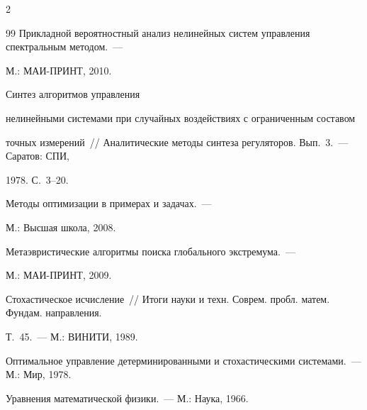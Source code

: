 \begin{multicols}{2}
{{\begin{thebibliography}{99}
Прикладной вероятностный анализ нелинейных сис\-тем управления спектральным методом.~--- 


М.: МАИ-ПРИНТ, 2010.







 Синтез алгоритмов управления 


нелинейными сис\-те\-мами при случайных воздействиях с ограниченным составом


точных измерений~// Аналитические методы синтеза регуляторов. Вып.~3.~--- Саратов: СПИ, 


1978. С.~3--20.







 Методы оптимизации в примерах и задачах.~--- 


М.: Высшая школа, 2008.







  Метаэвристические алгоритмы поиска глобального экстремума.~--- 


М.: МАИ-ПРИНТ, 2009.









Стохастическое исчисление~// Итоги науки и техн. Соврем. пробл. матем. Фундам. направления. 


Т.~45.~--- М.: ВИНИТИ, 1989.









Оптимальное управление детерминированными и стохастическими сис\-те\-мами.~--- М.: Мир, 1978.







 Уравнения математической физики.~--- М.: Наука, 1966.








\end{thebibliography}}}
\end{multicols}

